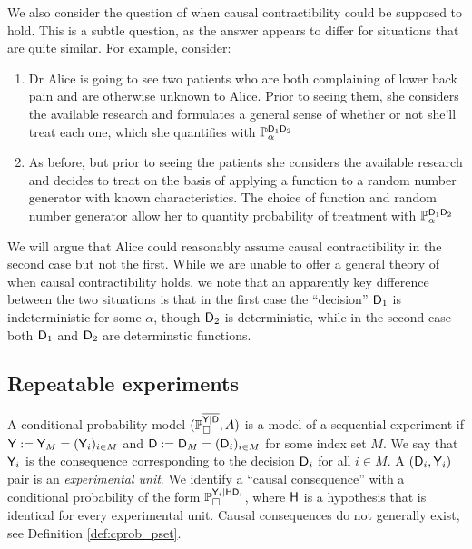 We also consider the question of when causal contractibility could be supposed to hold. This is a subtle question, as the answer appears to differ for situations that are quite similar. For example, consider:
\begin{enumerate}
    \item Dr Alice is going to see two patients who are both complaining of lower back pain and are otherwise unknown to Alice. Prior to seeing them, she considers the available research and formulates a general sense of whether or not she'll treat each one, which she quantifies with $\mathbb{P}_\alpha^{\mathsf{D}_1\mathsf{D}_2}$
    \item As before, but prior to seeing the patients she considers the available research and decides to treat on the basis of applying a function to a random number generator with known characteristics. The choice of function and random number generator allow her to quantity probability of treatment with $\mathbb{P}_\alpha^{\mathsf{D}_1\mathsf{D}_2}$
\end{enumerate}


We will argue that Alice could reasonably assume causal contractibility in the second case but not the first. While we are unable to offer a general theory of when causal contractibility holds, we note that an apparently key difference between the two situations is that in the first case the ``decision'' $\mathsf{D}_1$ is indeterministic for some $\alpha$, though $\mathsf{D}_2$ is deterministic, while in the second case both $\mathsf{D}_1$ and $\mathsf{D}_2$ are determinstic functions.

\subsection{Repeatable experiments}

A conditional probability model $(\mathbb{P}_\square^{\overline{\mathsf{Y}|\mathsf{D}}},A)$ is a model of a sequential experiment if $\mathsf{Y}:=\mathsf{Y}_M=(\mathsf{Y}_i)_{i\in M}$ and $\mathsf{D}:=\mathsf{D}_M=(\mathsf{D}_i)_{i\in M}$ for some index set $M$. We say that $\mathsf{Y}_i$ is the consequence corresponding to the decision $\mathsf{D}_i$ for all $i\in M$. A $(\mathsf{D}_i,\mathsf{Y}_i)$ pair is an \emph{experimental unit}. We identify a ``causal consequence'' with a conditional probability of the form $\mathbb{P}_\square^{\mathsf{Y}_i|\mathsf{H}\mathsf{D}_i}$, where $\mathsf{H}$ is a hypothesis that is identical for every experimental unit. Causal consequences do not generally exist, see Definition \ref{def:cprob_pset}.

